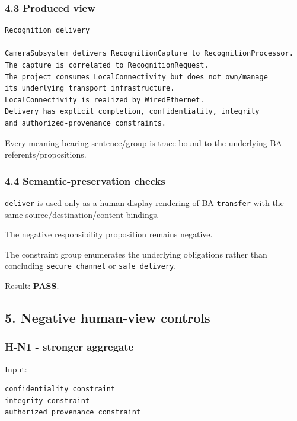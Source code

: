 \documentclass[11pt,a4paper]{article}
\begin{document}
\subsubsection{4.3 Produced view}\label{43-produced-view}

\begin{verbatim}
Recognition delivery

CameraSubsystem delivers RecognitionCapture to RecognitionProcessor.
The capture is correlated to RecognitionRequest.
The project consumes LocalConnectivity but does not own/manage
its underlying transport infrastructure.
LocalConnectivity is realized by WiredEthernet.
Delivery has explicit completion, confidentiality, integrity
and authorized-provenance constraints.
\end{verbatim}

Every meaning-bearing sentence/group is trace-bound to the underlying BA referents/propositions.

\subsubsection{4.4 Semantic-preservation checks}\label{44-semantic-preservation-checks}

\texttt{deliver} is used only as a human display rendering of BA \texttt{transfer} with the same source/destination/content bindings.

The negative responsibility proposition remains negative.

The constraint group enumerates the underlying obligations rather than concluding \texttt{secure\ channel} or \texttt{safe\ delivery}.

Result: \textbf{PASS}.

\subsection{5. Negative human-view controls}\label{5-negative-human-view-controls}

\subsubsection{H-N1 - stronger aggregate}\label{h-n1---stronger-aggregate}

Input:

\begin{verbatim}
confidentiality constraint
integrity constraint
authorized provenance constraint
\end{verbatim}
\end{document}
